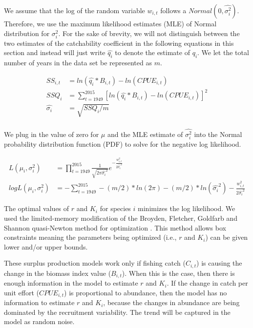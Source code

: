 \documentclass[oneside,12pt,final]{sty/ucthesis-CA2012}
\let\cite\citep                             %
\begin{document}
\begin{mainmatter}
We assume that the log of the random variable $w_{i,t}$ follows a $Normal(0,\widehat{\sigma_i^2})$. Therefore, we use the maximum likelihood estimates (MLE) of Normal distribution for $\sigma_i^2$.  For the sake of brevity, we will not distinguish between the two estimates of the catchability coefficient in the following equations in this section and instead will just write $\widehat{q_i}$ to denote the estimate of $q_i$. We let the total number of years in the data set be represented as $m$.

 \begin{align*}
SS_{i,t} & = ln(\widehat{q_{i}}*B_{i,t}) - ln(CPUE_{i,t}) \\
SSQ_i & = \sum_{t=1949}^{2015}[ln(\widehat{q_{i}}*B_{i,t}) - ln(CPUE_{i,t})]^2  \\
\widehat{\sigma_i} &=\sqrt{SSQ_i/m} \\
\end{align*} 

We plug in the value of zero for $\mu$ and the MLE estimate of $\widehat{\sigma_i^2}$ into the Normal probability distribution function (PDF) to solve for the negative log likelihood. 

\begin{align} \label{ln_likelihood}
L(\mu_i,\sigma_i^2) &= \prod_{t=1949}^{2015} \frac{1}{\sqrt{2\pi\widehat{\sigma_i}^2}}e^{-\frac{w_{i,t}^2}{2\widehat{\sigma_i}^2}} \\ \label{ln_loglikelihood}
logL(\mu_i,\sigma_i^2) &= - \sum_{t=1949}^{2015} -(m/2)*ln(2\pi) - (m/2)*ln(\widehat{\sigma_i}^2) - \frac{w_{i,t}^2}{2\widehat{\sigma_i}^2}
\end{align}

The optimal values of $r$ and $K_i$ for species $i$ minimizes the log likelihood. We used the limited-memory modification of the Broyden, Fletcher, Goldfarb and Shannon quasi-Newton method for optimization \cite{shanno1970conditioning,byrd1995limited}. This method allows box constraints meaning the parameters being optimized (i.e., $r$ and $K_i$) can be given lower and/or upper bounds. 

\vspace{5mm}

These surplus production models work only if fishing catch ($C_{i,t}$) is causing the change in the biomass index value ($B_{i,t}$). When this is the case, then there is enough information in the model to estimate $r$ and $K_i$. If the change in catch per unit effort ($CPUE_{i,t}$) is proportional to abundance, then the model has no information to estimate $r$ and $K_i$, because the changes in abundance are being dominated by the recruitment variability. The trend will  be captured in the model as random noise. 



\end{mainmatter}
\end{document}

